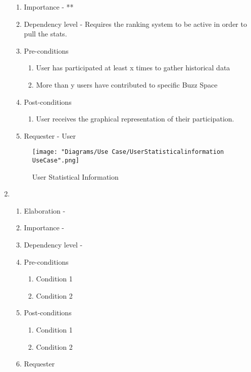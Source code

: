 \documentclass[12pt]{article}
\begin{document}
\begin{enumerate}
\begin{enumerate}
    \item Importance - **
    \item Dependency level - Requires the ranking system to be active in order to pull the stats. 
    \item Pre-conditions
    \begin{enumerate}
    	\item User has participated at least x times to gather historical data
    	\item More than y users have contributed to specific Buzz Space
    \end{enumerate}
        \item Post-conditions
    \begin{enumerate}
    	\item User receives the graphical representation of their participation.
    \end{enumerate}
    \item Requester - User
  \end{enumerate}
  \begin{figure}[h]
  	\centering
  	\texttt{[image: "Diagrams/Use Case/UserStatisticalinformation UseCase".png]}
  	\caption{User Statistical Information}
  \end{figure}
\newpage %
   \item  %
  \begin{enumerate}
    \item Elaboration - 
    \item Importance - 
    \item Dependency level - 
    \item Pre-conditions
    \begin{enumerate}
    	\item Condition 1
    	\item Condition 2
    \end{enumerate}
        \item Post-conditions
    \begin{enumerate}
    	\item Condition 1
    	\item Condition 2
    \end{enumerate}
    \item Requester
  \end{enumerate}
\newpage %

\end{enumerate}
\end{document}

